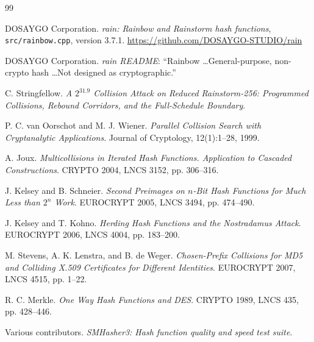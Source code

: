 \documentclass[10pt]{article}
\theoremstyle{definition}
\newcommand{\code}[1]{\texttt{#1}}
\begin{document}
\begin{thebibliography}{99}

DOSAYGO Corporation.
\newblock \emph{rain: Rainbow and Rainstorm hash functions}, \code{src/rainbow.cpp}, version 3.7.1.
\newblock \url{https://github.com/DOSAYGO-STUDIO/rain}

DOSAYGO Corporation.
\newblock \emph{rain README}: ``Rainbow \dots General-purpose, non-crypto hash \dots Not designed as cryptographic.''

C. Stringfellow.
\newblock \emph{A $2^{31.9}$ Collision Attack on Reduced Rainstorm-256: Programmed Collisions, Rebound Corridors, and the Full-Schedule Boundary}.

P. C. van Oorschot and M. J. Wiener.
\newblock \emph{Parallel Collision Search with Cryptanalytic Applications}.
\newblock Journal of Cryptology, 12(1):1--28, 1999.

A. Joux.
\newblock \emph{Multicollisions in Iterated Hash Functions. Application to Cascaded Constructions}.
\newblock CRYPTO 2004, LNCS 3152, pp. 306--316.

J. Kelsey and B. Schneier.
\newblock \emph{Second Preimages on $n$-Bit Hash Functions for Much Less than $2^n$ Work}.
\newblock EUROCRYPT 2005, LNCS 3494, pp. 474--490.

J. Kelsey and T. Kohno.
\newblock \emph{Herding Hash Functions and the Nostradamus Attack}.
\newblock EUROCRYPT 2006, LNCS 4004, pp. 183--200.

M. Stevens, A. K. Lenstra, and B. de Weger.
\newblock \emph{Chosen-Prefix Collisions for MD5 and Colliding X.509 Certificates for Different Identities}.
\newblock EUROCRYPT 2007, LNCS 4515, pp. 1--22.

R. C. Merkle.
\newblock \emph{One Way Hash Functions and DES}.
\newblock CRYPTO 1989, LNCS 435, pp. 428--446.

Various contributors.
\newblock \emph{SMHasher3: Hash function quality and speed test suite}.

\end{thebibliography}
\end{document}
